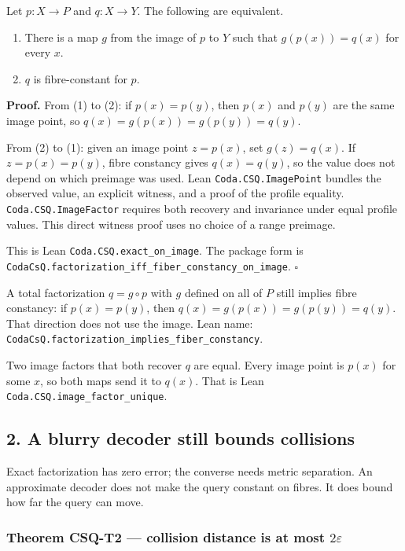 \documentclass[
  11pt,
]{article}
\providecommand{\tightlist}{%
  \setlength{\itemsep}{0pt}\setlength{\parskip}{0pt}}
\begin{document}
Let \(p:X\to P\) and \(q:X\to Y\). The following are equivalent.

\begin{enumerate}
\def\labelenumi{\arabic{enumi}.}
\tightlist
\item
  There is a map \(g\) from the image of \(p\) to \(Y\) such that \(g(p(x))=q(x)\) for every \(x\).
\item
  \(q\) is fibre-constant for \(p\).
\end{enumerate}

\textbf{Proof.} From (1) to (2): if \(p(x)=p(y)\), then \(p(x)\) and \(p(y)\) are the same image point, so \(q(x)=g(p(x))=g(p(y))=q(y)\).

From (2) to (1): given an image point \(z=p(x)\), set \(g(z)=q(x)\). If \(z=p(x)=p(y)\), fibre constancy gives \(q(x)=q(y)\), so the value does not depend on which preimage was used. Lean \nolinkurl{Coda.CSQ.ImagePoint} bundles the observed value, an explicit witness, and a proof of the profile equality. \nolinkurl{Coda.CSQ.ImageFactor} requires both recovery and invariance under equal profile values. This direct witness proof uses no choice of a range preimage.

This is Lean \nolinkurl{Coda.CSQ.exact_on_image}. The package form is \nolinkurl{CodaCsQ.factorization_iff_fiber_constancy_on_image}. \(\square\)

A total factorization \(q=g\circ p\) with \(g\) defined on all of \(P\) still implies fibre constancy: if \(p(x)=p(y)\), then \(q(x)=g(p(x))=g(p(y))=q(y)\). That direction does not use the image. Lean name: \nolinkurl{CodaCsQ.factorization_implies_fiber_constancy}.

Two image factors that both recover \(q\) are equal. Every image point is \(p(x)\) for some \(x\), so both maps send it to \(q(x)\). That is Lean \nolinkurl{Coda.CSQ.image_factor_unique}.

\subsection{2. A blurry decoder still bounds collisions}\label{a-blurry-decoder-still-bounds-collisions}

Exact factorization has zero error; the converse needs metric separation. An approximate decoder does not make the query constant on fibres. It does bound how far the query can move.

\subsubsection{\texorpdfstring{Theorem CSQ-T2 --- collision distance is at most \(2\varepsilon\)}{Theorem CSQ-T2 --- collision distance is at most 2\textbackslash varepsilon}}\label{theorem-csq-t2-collision-distance-is-at-most-2varepsilon}
\end{document}
